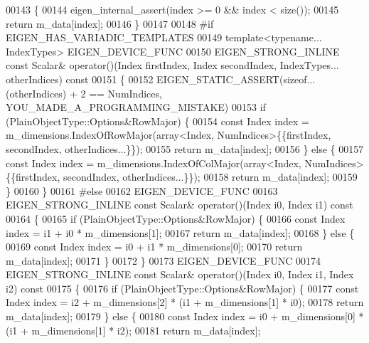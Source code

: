 \begin{DoxyCode}
00143 \textcolor{keyword}{    }\{
00144       eigen\_internal\_assert(index >= 0 && index < size());
00145       \textcolor{keywordflow}{return} m\_data[index];
00146     \}
00147 
00148 \textcolor{preprocessor}{#if EIGEN\_HAS\_VARIADIC\_TEMPLATES}
00149     \textcolor{keyword}{template}<\textcolor{keyword}{typename}... IndexTypes> EIGEN\_DEVICE\_FUNC
00150     EIGEN\_STRONG\_INLINE \textcolor{keyword}{const} Scalar& operator()(Index firstIndex, Index secondIndex, IndexTypes... 
      otherIndices)\textcolor{keyword}{ const}
00151 \textcolor{keyword}{    }\{
00152       EIGEN\_STATIC\_ASSERT(\textcolor{keyword}{sizeof}...(otherIndices) + 2 == NumIndices, YOU\_MADE\_A\_PROGRAMMING\_MISTAKE)
00153       \textcolor{keywordflow}{if} (PlainObjectType::Options&RowMajor) \{
00154         \textcolor{keyword}{const} Index index = m\_dimensions.IndexOfRowMajor(array<Index, NumIndices>\{\{firstIndex, secondIndex,
       otherIndices...\}\});
00155         \textcolor{keywordflow}{return} m\_data[index];
00156       \} \textcolor{keywordflow}{else} \{
00157         \textcolor{keyword}{const} Index index = m\_dimensions.IndexOfColMajor(array<Index, NumIndices>\{\{firstIndex, secondIndex,
       otherIndices...\}\});
00158         \textcolor{keywordflow}{return} m\_data[index];
00159       \}
00160     \}
00161 \textcolor{preprocessor}{#else}
00162     EIGEN\_DEVICE\_FUNC
00163     EIGEN\_STRONG\_INLINE \textcolor{keyword}{const} Scalar& operator()(Index i0, Index i1)\textcolor{keyword}{ const}
00164 \textcolor{keyword}{    }\{
00165       \textcolor{keywordflow}{if} (PlainObjectType::Options&RowMajor) \{
00166         \textcolor{keyword}{const} Index index = i1 + i0 * m\_dimensions[1];
00167         \textcolor{keywordflow}{return} m\_data[index];
00168       \} \textcolor{keywordflow}{else} \{
00169         \textcolor{keyword}{const} Index index = i0 + i1 * m\_dimensions[0];
00170         \textcolor{keywordflow}{return} m\_data[index];
00171       \}
00172     \}
00173     EIGEN\_DEVICE\_FUNC
00174     EIGEN\_STRONG\_INLINE \textcolor{keyword}{const} Scalar& operator()(Index i0, Index i1, Index i2)\textcolor{keyword}{ const}
00175 \textcolor{keyword}{    }\{
00176       \textcolor{keywordflow}{if} (PlainObjectType::Options&RowMajor) \{
00177          \textcolor{keyword}{const} Index index = i2 + m\_dimensions[2] * (i1 + m\_dimensions[1] * i0);
00178          \textcolor{keywordflow}{return} m\_data[index];
00179       \} \textcolor{keywordflow}{else} \{
00180          \textcolor{keyword}{const} Index index = i0 + m\_dimensions[0] * (i1 + m\_dimensions[1] * i2);
00181         \textcolor{keywordflow}{return} m\_data[index];

\end{DoxyCode}
